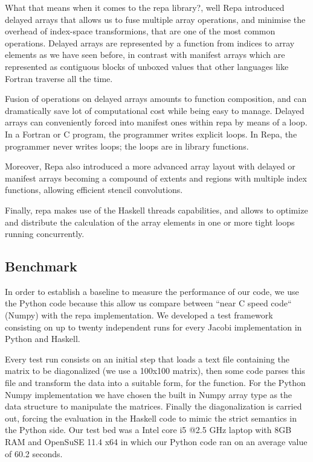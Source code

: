 \documentclass{tmr}
\begin{document}
What that means when it comes to the repa library?, well Repa introduced
delayed arrays that allows us to fuse multiple array operations, and 
minimise the overhead of index-space transformions, that are one of the most
common operations. Delayed arrays are represented by a function from indices 
to array elements as we have seen before, in contrast with manifest arrays
which are represented as contiguous blocks of unboxed values that other 
languages like Fortran traverse all the time. 

Fusion of operations on delayed arrays amounts to function composition, and 
can dramatically save lot of computational cost while being easy to manage. 
Delayed arrays can conveniently forced into manifest ones within repa by means 
of a loop. In a Fortran or C program, the programmer writes explicit loops. 
In Repa, the programmer never writes loops; the loops are in library functions.

Moreover, Repa also introduced a more advanced array layout with delayed or manifest 
arrays becoming a compound of extents and regions with multiple index functions, 
allowing efficient stencil convolutions.

Finally, repa makes use of the Haskell threads capabilities, and allows to optimize and
distribute the calculation of the array elements in one or more tight loops running concurrently.


\subsection{Benchmark}

In order to establish a baseline to measure the performance of our code, 
we use the Python code because this allow us compare between ``near C speed code``
(Numpy) with the repa implementation. We developed a test framework consisting 
on up to twenty independent runs for every Jacobi implementation in Python and Haskell.

Every test run consists on an initial step that loads a text file containing
the matrix to be diagonalized (we use a 100x100 matrix), then some code parses
this file and transform the data into a suitable form, for the  function. 
For the Python Numpy implementation we have chosen the built in Numpy array type
as the data structure to manipulate the matrices. Finally the diagonalization is
carried out, forcing the evaluation in the Haskell code to mimic the strict 
semantics in the Python side. Our test bed was a Intel core i5 @2.5 GHz 
laptop with 8GB RAM and OpenSuSE 11.4 x64 in which our Python code 
ran on an average value of 60.2 seconds. 
\end{document}
